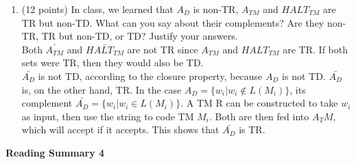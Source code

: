 \documentclass[11pt]{article}
\begin{document}
\begin{enumerate}
  \item (12 points) In class, we learned that $A_D$ is non-TR, $A_{TM}$ and $HALT_{TM}$ are TR but non-TD. What can you say 
	about their complements? Are they non-TR, TR but non-TD, or TD? Justify your answers. \\
	
	Both $\bar{A_{TM}}$ and $\bar{HALT_{TM}}$ are not TR since $A_{TM}$ and $HALT_{TM}$ are TR. If both sets were TR, then
	they would also be TD. \\
	$\bar{A_D}$ is not TD, according to the closure property, because $A_D$ is not TD. $\bar{A_D}$ is, on the other hand, TR.
	In the case $A_D = \{w_i | w_i \notin L(M_i) \}$, its complement $\bar{A_D} = \{w_i | w_i \in L(M_i) \}$. A TM R can be
	constructed to take $w_i$ as input, then use the string to code TM $M_i$. Both are then fed into $A_TM$, which will accept
	if it accepts. This shows that $\bar{A_D}$ is TR.
\end{enumerate}

\pagebreak
\setlength{\parindent}{1cm}
\centerline{\bf Reading Summary 4}
\end{document}
